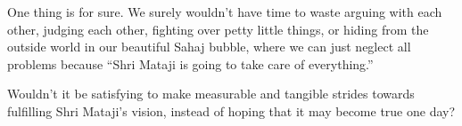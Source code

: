 \documentclass[12pt]{article}
\begin{document}
One thing is for sure.
We surely wouldn't have time to waste arguing with each other, judging each other, fighting over petty little things, or hiding from the outside world in our beautiful Sahaj bubble, where we can just neglect all problems because ``Shri Mataji is going to take care of everything.''

Wouldn't it be satisfying to make measurable and tangible strides towards fulfilling Shri Mataji's vision, instead of hoping that it may become true one day?
\end{document}
